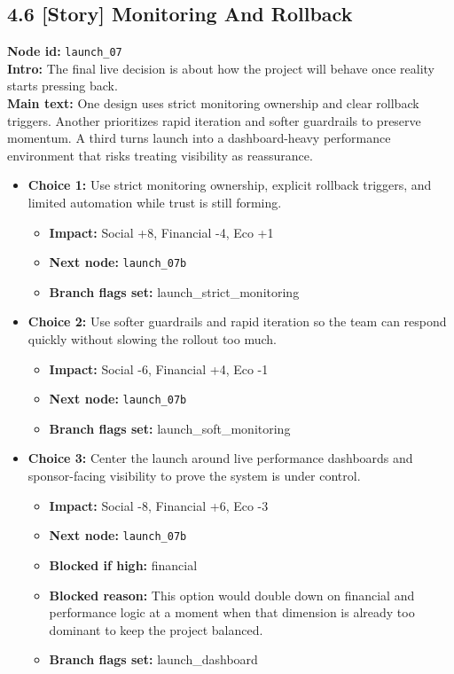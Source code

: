 \documentclass[11pt]{article}
\begin{document}
\subsection*{4.6 [Story] Monitoring And Rollback}
\textbf{Node id:} \texttt{launch\_07}\\
\textbf{Intro:} The final live decision is about how the project will behave once reality starts pressing back.\\
\textbf{Main text:} One design uses strict monitoring ownership and clear rollback triggers. Another prioritizes rapid iteration and softer guardrails to preserve momentum. A third turns launch into a dashboard-heavy performance environment that risks treating visibility as reassurance.\\
\begin{itemize}
\item \textbf{Choice 1:} Use strict monitoring ownership, explicit rollback triggers, and limited automation while trust is still forming.
\begin{itemize}
\item \textbf{Impact:} Social +8, Financial -4, Eco +1
\item \textbf{Next node:} \texttt{launch\_07b}
\item \textbf{Branch flags set:} launch\_strict\_monitoring
\end{itemize}
\item \textbf{Choice 2:} Use softer guardrails and rapid iteration so the team can respond quickly without slowing the rollout too much.
\begin{itemize}
\item \textbf{Impact:} Social -6, Financial +4, Eco -1
\item \textbf{Next node:} \texttt{launch\_07b}
\item \textbf{Branch flags set:} launch\_soft\_monitoring
\end{itemize}
\item \textbf{Choice 3:} Center the launch around live performance dashboards and sponsor-facing visibility to prove the system is under control.
\begin{itemize}
\item \textbf{Impact:} Social -8, Financial +6, Eco -3
\item \textbf{Next node:} \texttt{launch\_07b}
\item \textbf{Blocked if high:} financial
\item \textbf{Blocked reason:} This option would double down on financial and performance logic at a moment when that dimension is already too dominant to keep the project balanced.
\item \textbf{Branch flags set:} launch\_dashboard
\end{itemize}
\end{itemize}
\end{document}
